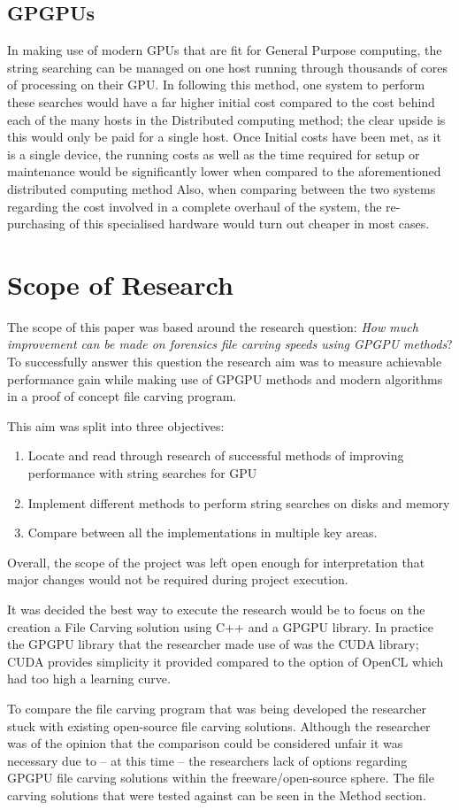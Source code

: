 \subsection*{\acfp{GPGPU}}
In making use of modern \acp{GPU} that are fit for General Purpose computing, the string searching can be managed on one host running through thousands of cores of processing on their \ac{GPU}.
In following this method, one system to perform these searches would have a far higher initial cost compared to the cost behind each of the many hosts in the Distributed computing method;
the clear upside is this would only be paid for a single host.
Once Initial costs have been met, as it is a single device, the running costs as well as the time required for setup or maintenance would be significantly lower when compared to the aforementioned distributed computing method
Also, when comparing between the two systems regarding the cost involved in a complete overhaul of the system, the re-purchasing of this specialised hardware would turn out cheaper in most cases.
\newpage
\section{Scope of Research}
The scope of this paper was based around the research question: \textit{How much improvement can be made on forensics file carving speeds using \acs{GPGPU} methods}?
To successfully answer this question the research aim was to measure achievable performance gain while making use of \acs{GPGPU} methods and modern algorithms in a proof of concept file carving program.

This aim was split into three objectives:
\begin{enumerate}[noitemsep, topsep=0pt]
  \item Locate and read through research of successful methods of improving performance with string searches for GPU
  \item Implement different methods to perform string searches on disks and memory
  \item Compare between all the implementations in multiple key areas.
\end{enumerate}

Overall, the scope of the project was left open enough for interpretation that major changes would not be required during project execution.

It was decided the best way to execute the research would be to focus on the creation a File Carving solution using C++ and a \ac{GPGPU} library.
In practice the \ac{GPGPU} library that the researcher made use of was the CUDA library; CUDA provides simplicity it provided compared to the option of OpenCL which had too high a learning curve.

To compare the file carving program that was being developed the researcher stuck with existing open-source file carving solutions.
Although the researcher was of the opinion that the comparison could be considered unfair it was necessary due to -- at this time -- the researchers lack of options regarding GPGPU file carving solutions within the freeware/open-source sphere.
The file carving solutions that were tested against can be seen in the Method section.
